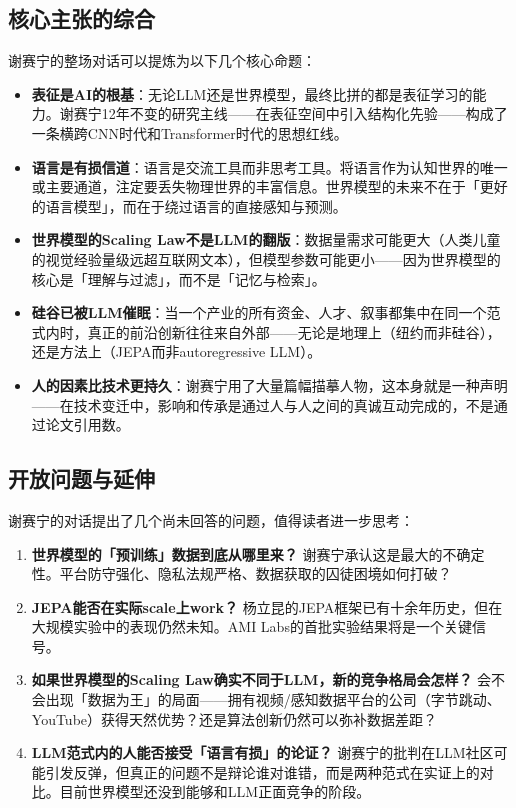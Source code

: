 \documentclass[a4paper]{article}
\begin{document}
\subsection{核心主张的综合}

谢赛宁的整场对话可以提炼为以下几个核心命题：

\begin{itemize}
  \item \textbf{表征是AI的根基}：无论LLM还是世界模型，最终比拼的都是表征学习的能力。谢赛宁12年不变的研究主线——在表征空间中引入结构化先验——构成了一条横跨CNN时代和Transformer时代的思想红线。
  \item \textbf{语言是有损信道}：语言是交流工具而非思考工具。将语言作为认知世界的唯一或主要通道，注定要丢失物理世界的丰富信息。世界模型的未来不在于「更好的语言模型」，而在于绕过语言的直接感知与预测。
  \item \textbf{世界模型的Scaling Law不是LLM的翻版}：数据量需求可能更大（人类儿童的视觉经验量级远超互联网文本），但模型参数可能更小——因为世界模型的核心是「理解与过滤」，而不是「记忆与检索」。
  \item \textbf{硅谷已被LLM催眠}：当一个产业的所有资金、人才、叙事都集中在同一个范式内时，真正的前沿创新往往来自外部——无论是地理上（纽约而非硅谷），还是方法上（JEPA而非autoregressive LLM）。
  \item \textbf{人的因素比技术更持久}：谢赛宁用了大量篇幅描摹人物，这本身就是一种声明——在技术变迁中，影响和传承是通过人与人之间的真诚互动完成的，不是通过论文引用数。
\end{itemize}

\subsection{开放问题与延伸}

谢赛宁的对话提出了几个尚未回答的问题，值得读者进一步思考：

\begin{enumerate}
  \item \textbf{世界模型的「预训练」数据到底从哪里来？} 谢赛宁承认这是最大的不确定性。平台防守强化、隐私法规严格、数据获取的囚徒困境如何打破？
  \item \textbf{JEPA能否在实际scale上work？} 杨立昆的JEPA框架已有十余年历史，但在大规模实验中的表现仍然未知。AMI Labs的首批实验结果将是一个关键信号。
  \item \textbf{如果世界模型的Scaling Law确实不同于LLM，新的竞争格局会怎样？} 会不会出现「数据为王」的局面——拥有视频/感知数据平台的公司（字节跳动、YouTube）获得天然优势？还是算法创新仍然可以弥补数据差距？
  \item \textbf{LLM范式内的人能否接受「语言有损」的论证？} 谢赛宁的批判在LLM社区可能引发反弹，但真正的问题不是辩论谁对谁错，而是两种范式在实证上的对比。目前世界模型还没到能够和LLM正面竞争的阶段。
\end{enumerate}
\end{document}

